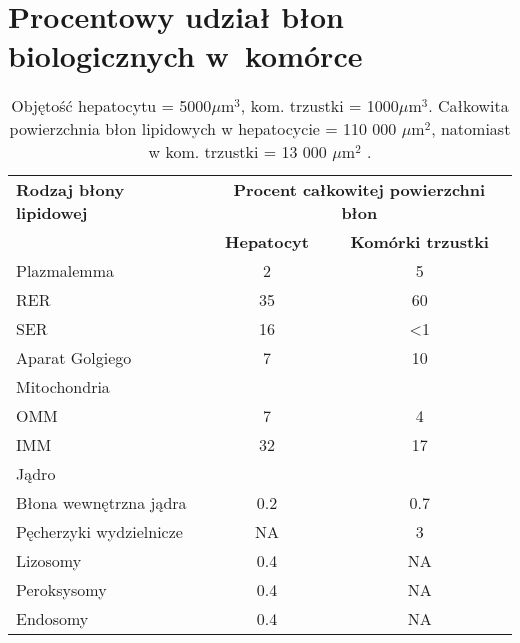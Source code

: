 \chapter{Procentowy udział błon biologicznych w~komórce}\label{app:b}

\begin{table}[h]
\centering
\caption[Pole powierzchni organelli komórkowych]{Objętość hepatocytu = 5000$\mu$m$^3$, kom. trzustki = 1000$\mu$m$^3$. Całkowita powierzchnia błon lipidowych w hepatocycie = 110 000 $\mu$m$^2$, natomiast w kom. trzustki = 13 000 $\mu$m$^2$ \cite{Alberts2002}.}
\begin{tabular}{lcc}\toprule[0.12em]
\rule[-2ex]{0pt}{5.5ex}\textbf{Rodzaj błony lipidowej} & \multicolumn{2}{c}{\textbf{Procent całkowitej powierzchni błon}} \\\cline{2-3}
\rule[-2ex]{0pt}{5.5ex}& \textbf{Hepatocyt} & \textbf{Komórki trzustki} \\\midrule[0.06em]
Plazmalemma & 2 & 5 \\
RER & 35 & 60 \\
SER & 16 & <1 \\
Aparat Golgiego & 7 & 10 \\
Mitochondria &  &  \\
OMM & 7 & 4 \\
IMM & 32 & 17 \\
Jądro &  &  \\
Błona wewnętrzna jądra & 0.2 & 0.7 \\
Pęcherzyki wydzielnicze & NA & 3 \\
Lizosomy & 0.4 & NA \\
Peroksysomy & 0.4 & NA \\
Endosomy & 0.4 & NA \\\bottomrule[0.12em]
\end{tabular}
\end{table}